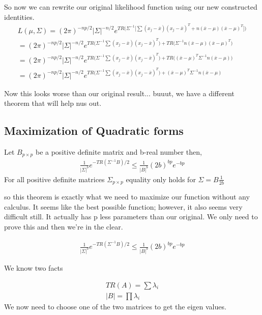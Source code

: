 So now we can rewrite our original likelihood function using our new constructed identities.
\begin{gather*}
    L(\mu,\Sigma)=(2\pi)^{-np/2}|\Sigma|^{-n/2}e^{TR \Bigg(\Sigma^{-1} \Big[ \sum(x_j-\overline{x})(x_j-\overline{x})^T+n
    (\overline{x}-\mu)(\overline{x}-\mu)^T \Big] \Bigg)}\\
    =
    (2\pi)^{-np/2}|\Sigma|^{-n/2}e^{
    TR \big(\Sigma^{-1} \sum(x_j-\overline{x})(x_j-\overline{x})^T \big)
    +
    TR \big( \Sigma^{-1} n (\overline{x}-\mu)(\overline{x}-\mu)^T \big)
    }\\
    =
    (2\pi)^{-np/2}|\Sigma|^{-n/2}e^{
    TR \big(\Sigma^{-1} \sum(x_j-\overline{x})(x_j-\overline{x})^T \big)
    +
    TR \big( (\overline{x}-\mu)^T\Sigma^{-1} n (\overline{x}-\mu) \big)
    }\\
    =
    (2\pi)^{-np/2}|\Sigma|^{-n/2}e^{
    TR \big(\Sigma^{-1} \sum(x_j-\overline{x})(x_j-\overline{x})^T \big)
    +
    (\overline{x}-\mu)^T\Sigma^{-1} n (\overline{x}-\mu)
    }
\end{gather*}

Now this looks worse than our original result... buuut, we have a different theorem that will help nus out. 

\subsection{Maximization of Quadratic forms}
Let $B_{p \times p}$ be a positive definite matrix and b-real number then,
\begin{gather*}
    \frac{1}{|\Sigma|^b}e^{-TR(\Sigma^{-1}B)/2} \leq \frac{1}{|B|^b}(2b)^{bp}e^{-bp}
\end{gather*}
For all positive definite matrices $\Sigma_{p \times p}$ equality only holds for $\Sigma=B\frac{1}{2b}$

so this theorem is exactly what we need to maximize our function without any calculus. It seems like the best possible function; however, it also seems very difficult still. It actually has p less parameters than our original. We only  need to prove this and then we're in the clear.

\begin{gather*}
    \frac{1}{|\Sigma|^b}e^{-TR(\Sigma^{-1}B)/2} \leq \frac{1}{|B|^b}(2b)^{bp}e^{-bp}
\end{gather*}

We know two facts

\begin{gather*}
    TR(A) = \sum \lambda_i \\
    |B| = \prod \lambda_i
\end{gather*}
We now need to choose one of the two matrices to get the eigen values.


